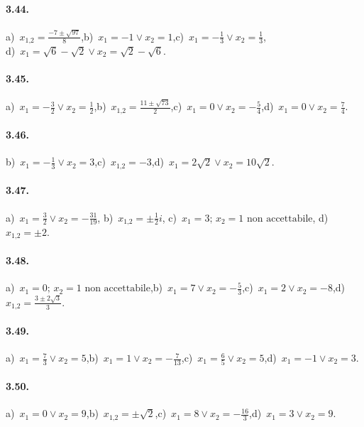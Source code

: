 \paragraph{3.44.} a)~$x_{1\text{,}2} = \frac{- 7 \pm \sqrt{97}}{8}$,\quad b)~$x_{1} =-1 \vee x_{2} = 1$,\quad c)~$x_{1} =-\frac{1}{3} \vee x_{2} = \frac{1}{3}$,\protect \\ \quad d)~$x_{1} = \sqrt{6}-\sqrt{2} \vee x_{2} = \sqrt{2}-\sqrt{6}$.

\paragraph{3.45.} a)~$x_{1} =-\frac{3}{2} \vee x_{2} = \frac{1}{2}$,\quad b)~$x_{1\text{,}2} = \frac{11 \pm \sqrt{73}}{2}$,\quad c)~$x_{1} = 0 \vee x_{2} =-\frac{5}{4}$,\quad d)~$x_{1} = 0 \vee x_{2} = \frac{7}{4}$.

\paragraph{3.46.} b)~$x_{1} =-\frac{1}{3} \vee x_{2} = 3$,\quad c)~$x_{1\text{,}2} = -3$,\quad d)~$x_{1} = 2\sqrt{2} \vee x_{2} =10\sqrt{2}$.

\paragraph{3.47.} a)~$x_{1} =\frac{3}{2} \vee x_{2} =-\frac{31}{19}$,\; b)~$x_{1\text{,}2} = \pm\frac{1}{2}i$,\; c)~$x_{1} =3;\,x_{2} =1\text{ non accettabile}$,\; d)~$x_{1\text{,}2} = \pm 2$.

\paragraph{3.48.} a)~$x_{1} =0;\,x_{2} =1\text{ non accettabile}$,\quad b)~$x_{1} =7 \vee x_{2} =-\frac{5}{3}$,\quad c)~$x_{1} =2 \vee x_{2} =-8$,\quad d)~$x_{1\text{,}2} = \frac{3 \pm 2\sqrt{3}}{3}$.

\paragraph{3.49.} a)~$x_{1} =\frac{7}{3} \vee x_{2} = 5$,\quad b)~$x_{1} =1 \vee x_{2} = -\frac{7}{13}$,\quad c)~$x_{1} =\frac{6}{5} \vee x_{2} =5$,\quad d)~$x_{1} =-1 \vee x_{2} = 3$.

\paragraph{3.50.} a)~$x_{1} =0 \vee x_{2} = 9$,\quad b)~$x_{1\text{,}2} = \pm \sqrt{2}$,\quad c)~$x_{1} =8 \vee x_{2} =-\frac{16}{3}$,\quad d)~$x_{1} =3 \vee x_{2} = 9$.

